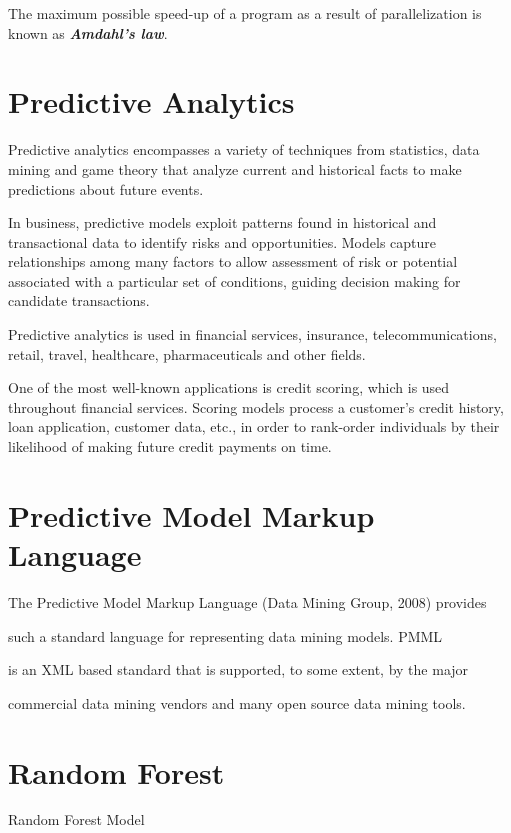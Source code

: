 \documentclass[11pt]{article} %
\begin{document}
The maximum possible speed-up of a program as a result of parallelization is known as \textbf{\textit{Amdahl's law}}.

\newpage
\section{Predictive Analytics}

Predictive analytics encompasses a variety of techniques from statistics, data mining and game theory that analyze current and historical facts to make predictions about future events.

In business, predictive models exploit patterns found in historical and transactional data to identify risks and opportunities. Models capture relationships among many factors to allow assessment of risk or potential associated with a particular set of conditions, guiding decision making for candidate transactions.

Predictive analytics is used in financial services, insurance, telecommunications, retail, travel, healthcare, pharmaceuticals and other fields.

One of the most well-known applications is credit scoring, which is used throughout financial services. Scoring models process a customer's credit history, loan application, customer data, etc., in order to rank-order individuals by their likelihood of making future credit payments on time.

\newpage
\section{Predictive Model Markup Language }




The Predictive Model Markup Language (Data Mining Group, 2008) provides 



such a standard language for representing data mining models. PMML



is an XML based standard that is supported, to some extent, by the major 



commercial data mining vendors and many open source data mining tools.
\newpage
\section{Random Forest}
Random Forest Model
\end{document}

